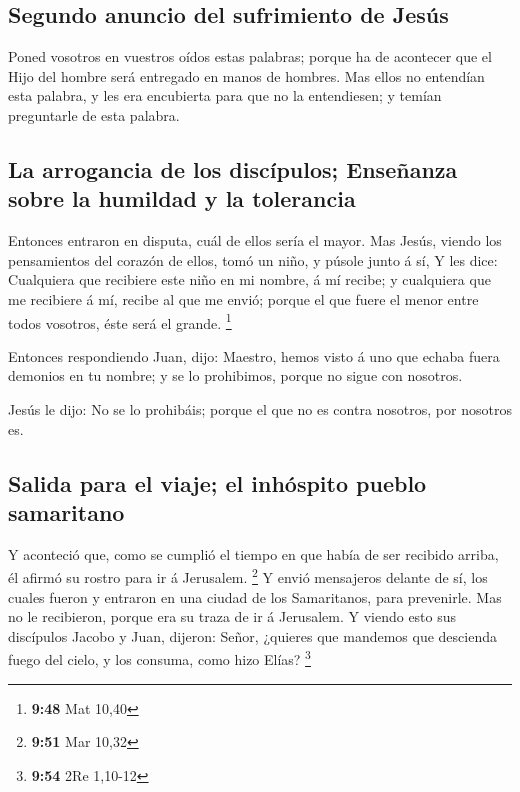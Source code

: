 \hypertarget{segundo-anuncio-del-sufrimiento-de-jesuxfas}{%
\subsection{Segundo anuncio del sufrimiento de
Jesús}\label{segundo-anuncio-del-sufrimiento-de-jesuxfas}}

 Poned vosotros en vuestros oídos estas palabras; porque
ha de acontecer que el Hijo del hombre será entregado en manos de
hombres.  Mas ellos no entendían esta palabra, y les era
encubierta para que no la entendiesen; y temían preguntarle de esta
palabra.

\hypertarget{la-arrogancia-de-los-discuxedpulos-enseuxf1anza-sobre-la-humildad-y-la-tolerancia}{%
\subsection{La arrogancia de los discípulos; Enseñanza sobre la humildad
y la
tolerancia}\label{la-arrogancia-de-los-discuxedpulos-enseuxf1anza-sobre-la-humildad-y-la-tolerancia}}

 Entonces entraron en disputa, cuál de ellos sería el
mayor.  Mas Jesús, viendo los pensamientos del corazón de
ellos, tomó un niño, y púsole junto á sí,  Y les dice:
Cualquiera que recibiere este niño en mi nombre, á mí recibe; y
cualquiera que me recibiere á mí, recibe al que me envió; porque el que
fuere el menor entre todos vosotros, éste será el grande. \footnote{\textbf{9:48}
  Mat 10,40}

 Entonces respondiendo Juan, dijo: Maestro, hemos visto á
uno que echaba fuera demonios en tu nombre; y se lo prohibimos, porque
no sigue con nosotros.

 Jesús le dijo: No se lo prohibáis; porque el que no es
contra nosotros, por nosotros es.

\hypertarget{salida-para-el-viaje-el-inhuxf3spito-pueblo-samaritano}{%
\subsection{Salida para el viaje; el inhóspito pueblo
samaritano}\label{salida-para-el-viaje-el-inhuxf3spito-pueblo-samaritano}}

 Y aconteció que, como se cumplió el tiempo en que había
de ser recibido arriba, él afirmó su rostro para ir á Jerusalem.
\footnote{\textbf{9:51} Mar 10,32}  Y envió mensajeros
delante de sí, los cuales fueron y entraron en una ciudad de los
Samaritanos, para prevenirle.  Mas no le recibieron,
porque era su traza de ir á Jerusalem.  Y viendo esto sus
discípulos Jacobo y Juan, dijeron: Señor, ¿quieres que mandemos que
descienda fuego del cielo, y los consuma, como hizo Elías? \footnote{\textbf{9:54}
  2Re 1,10-12}

